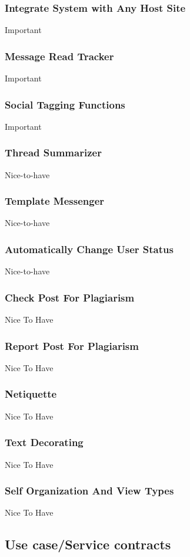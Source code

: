 \documentclass[hidelinks, 12pt, oneside]{article}
\begin{document}
\subsubsection{Integrate System with Any Host Site}
Important
\subsubsection{Message Read Tracker}
Important
\subsubsection{Social Tagging Functions}
Important
\subsubsection{Thread Summarizer}
Nice-to-have
\subsubsection{Template Messenger}
Nice-to-have
\subsubsection{Automatically Change User Status}
Nice-to-have
\subsubsection{Check Post For Plagiarism}
Nice To Have
\subsubsection{Report Post For Plagiarism}
Nice To Have
\subsubsection{Netiquette}
Nice To Have
\subsubsection{Text Decorating}
Nice To Have
\subsubsection{Self Organization And View Types}
Nice To Have


\subsection{Use case/Service contracts}
\end{document}
